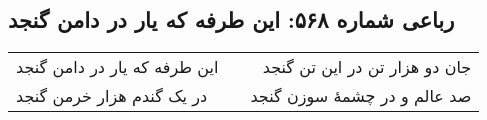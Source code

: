 \begin{center}
\section*{رباعی شماره ۵۶۸: این طرفه که یار در دامن گنجد}
\label{sec:0568}
\begin{longtable}{l p{0.5cm} r}
این طرفه که یار در دامن گنجد
&&
جان دو هزار تن در این تن گنجد
\\
در یک گندم هزار خرمن گنجد
&&
صد عالم و در چشمهٔ سوزن گنجد
\\
\end{longtable}
\end{center}
